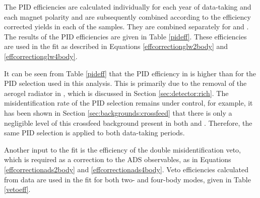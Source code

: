 The PID efficiencies are calculated individually for each year of data-taking and each magnet polarity and are subsequently combined according to the efficiency corrected yields in each of the samples. They are combined separately for \runone and \runtwo. The results of the PID efficiencies are given in Table \ref{pideff}. These efficiencies are used in the \CP fit as described in Equations \ref{effcorrectionglw2body} and \ref{effcorrectionglw4body}. 

\begin{table}[h]
\centering
{}
\caption{Summary of the PID efficiencies used in the \CP fit.}
\label{pideff}
\end{table}

It can be seen from Table \ref{pideff} that the PID efficiency in \runtwo is higher than \runone for the PID selection used in this analysis. This is primarily due to the removal of the aerogel radiator in \runtwo, which is discussed in Section \ref{sec:detector:rich}. The misidentification rate of the PID selection remains under control, for example, it has been shown in Section \ref{sec:backgrounds:crossfeed} that there is only a negligible level of this crossfeed background present in both \runone and \runtwo. Therefore, the same PID selection is applied to both data-taking periods.

Another input to the fit is the efficiency of the double misidentification veto, which is required as a correction to the ADS observables, as in Equations \ref{effcorrectionads2body} and \ref{effcorrectionads4body}. Veto efficiencies calculated from data are used in the \CP fit for both two- and four-body modes, given in Table \ref{vetoeff}.

